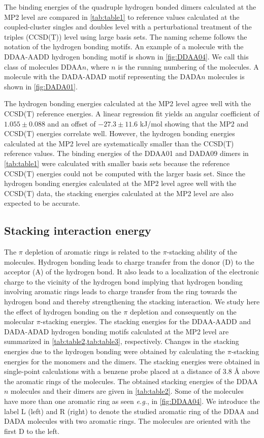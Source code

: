 \documentclass[twoside,twocolumn,9pt]{article}
\begin{document}
The binding energies of the quadruple hydrogen bonded dimers calculated at the
MP2 level are compared in \cref{tab:table1} to reference values calculated
at the coupled-cluster singles and doubles level with a perturbational
treatment of the triples (CCSD(T)) level using large basis
sets\cite{Usman:paper-1}. The naming scheme follows the notation of the
hydrogen bonding motifs.  An example of a molecule with the DDAA-AADD hydrogen
bonding motif is shown in \cref{fig:DDAA04}. We call this class of molecules
DDAA$n$, where $n$ is the running numbering of the molecules.  A molecule with
the DADA-ADAD motif representing the DADA$n$ molecules is shown in
\cref{fig:DADA01}. 


The hydrogen bonding energies calculated at the MP2 level agree well with
the CCSD(T) reference energies.  A linear regression fit yields an angular
coefficient of $1.055\pm0.088$ and an offset of $-27.3\pm11.6$ kJ/mol showing
that the MP2 and CCSD(T) energies correlate well. However, the hydrogen
bonding energies calculated at the MP2 level are systematically smaller
than the CCSD(T) reference values. The binding energies of the DDAA01 and
DADA09 dimers  in \cref{tab:table1} were calculated with smaller basis sets
because the reference CCSD(T) energies could not be computed with the larger
basis set.  Since the hydrogen bonding energies calculated at the MP2 level
agree well with the CCSD(T) data, the stacking energies calculated at the
MP2 level are also expected to be accurate. 


\subsection{Stacking interaction energy}
\label{sec:energy}

The $\pi$ depletion of aromatic rings is related to the $\pi$-stacking ability
of the molecules\cite{C2CC33886F,Bloom:11}. Hydrogen bonding leads to charge
transfer from the donor (D) to the acceptor (A) of the hydrogen bond. It also
leads to a localization of the electronic charge to the vicinity of the
hydrogen bond implying that hydrogen bonding involving aromatic rings leads to
charge transfer from the ring towards the hydrogen bond and thereby
strengthening the stacking interaction.  We study here the effect of hydrogen
bonding on the $\pi$ depletion and consequently on the molecular $\pi$-stacking
energies.  The stacking energies for the DDAA-AADD and DADA-ADAD hydrogen
bonding motifs calculated at the MP2 level are summarized in
\cref{tab:table2,tab:table3}, respectively. Changes in the stacking energies
due to the hydrogen bonding were obtained by calculating the $\pi$-stacking
energies for the monomers and the dimers.  The stacking energies were obtained
in single-point calculations with a benzene probe placed at a distance of 3.8
{\AA} above the aromatic rings of the molecules.  The obtained stacking
energies of the DDAA$n$ molecules and their dimers are given in
\cref{tab:table2}.  Some of the molecules have more than one aromatic ring as
seen \textit{e.g.}, in \cref{fig:DDAA04}.  We introduce the label L (left) and
R (right) to denote the studied aromatic ring of the DDAA and DADA molecules
with two aromatic rings.  The molecules are oriented with the first D to the
left. 
\end{document}
